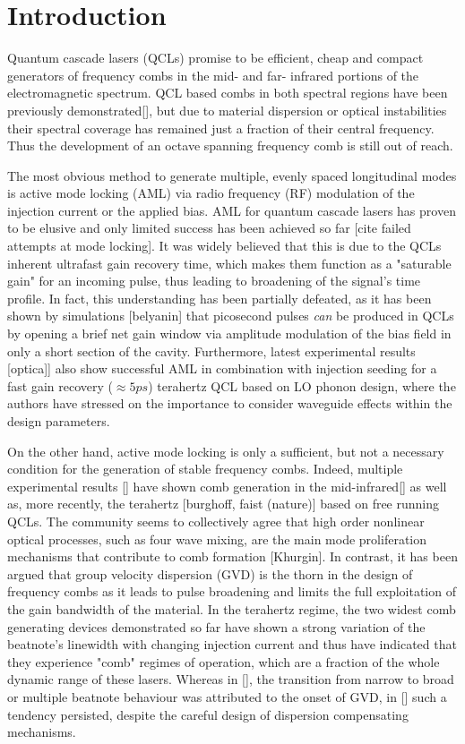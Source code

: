 \documentclass[10pt,letterpaper]{article}
\begin{document}
\section{Introduction}
\label{sec:intro}

Quantum cascade lasers (QCLs)  promise to be efficient, cheap and compact generators of frequency combs in the mid- and far- infrared portions of the electromagnetic spectrum. QCL based combs in both spectral regions have been previously demonstrated[], but due to material dispersion or optical instabilities their spectral coverage has remained just a fraction of their central frequency. Thus the development of an octave spanning frequency comb is still out of reach. 

The most obvious method to generate multiple, evenly spaced longitudinal modes is active mode locking (AML) via radio frequency (RF) modulation of the injection current or the applied bias. AML for quantum cascade lasers has proven to be elusive and only limited success has been achieved so far [cite failed attempts at mode locking]. It was widely believed that this is due to the QCLs inherent ultrafast gain recovery time, which makes them function as a "saturable gain" for an incoming pulse, thus leading to broadening of the signal's time profile. In fact, this understanding has been partially defeated, as it has been shown by simulations [belyanin] that picosecond pulses \emph{can} be produced in QCLs by opening a brief net gain window via amplitude modulation of the bias field in only a short section of the cavity. Furthermore, latest experimental results [optica]] also show successful AML in combination with injection seeding for a fast gain recovery ($\approx 5 ps$) terahertz QCL based on LO phonon design, where the authors have stressed on the importance to consider waveguide effects within the design parameters.  

On the other hand, active mode locking is only a sufficient, but not a necessary condition for the generation of stable frequency combs. Indeed, multiple experimental results [] have shown comb generation in the mid-infrared[] as well as, more recently, the terahertz [burghoff, faist (nature)] based on free running QCLs. The community seems to collectively agree that high order nonlinear optical processes, such as four wave mixing, are the main mode proliferation mechanisms that contribute to comb formation [Khurgin]. In contrast, it has been argued that group velocity dispersion (GVD) is the thorn in the design of frequency combs as it leads to pulse broadening and limits the full exploitation of the gain bandwidth of the material. In the terahertz regime, the two widest comb generating devices demonstrated so far have shown a strong variation of the beatnote's linewidth with changing injection current and thus have indicated that they experience "comb" regimes of operation, which are a fraction of the whole dynamic range of these lasers. Whereas in [], the transition from narrow to broad or multiple beatnote behaviour was attributed to the onset of GVD, in [] such a tendency persisted, despite the careful design of dispersion compensating mechanisms.
\end{document}
